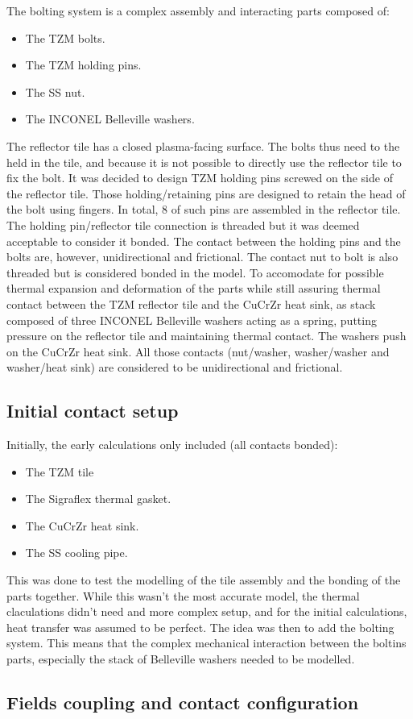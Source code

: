 \normalsize{\indent The bolting system is a complex assembly and interacting parts composed of:
\begin{itemize}
    \item The \acrshort{TZM} bolts.
    \item The \acrshort{TZM} holding pins.
    \item The \acrshort{SS} nut.
    \item The INCONEL Belleville washers.
  \end{itemize}
The reflector tile has a closed plasma-facing surface. The bolts thus need to the held in the tile, and because it is not possible to directly use the reflector tile to fix the bolt. It was decided to design \acrshort{TZM} holding pins screwed on the side of the reflector tile. Those holding/retaining pins are designed to retain the head of the bolt using fingers. In total, 8 of such pins are assembled in the reflector tile. The holding pin/reflector tile connection is threaded but it was deemed acceptable to consider it bonded. The contact between the holding pins and the bolts are, however, unidirectional and frictional. The contact nut to bolt is also threaded but is considered bonded in the model. To accomodate for possible thermal expansion and deformation of the parts while still assuring thermal contact between the \acrshort{TZM} reflector tile and the \acrshort{CuCrZr} heat sink, as stack composed of three INCONEL Belleville washers acting as a spring, putting pressure on the reflector tile and maintaining thermal contact. The washers push on the \acrshort{CuCrZr} heat sink. All those contacts (nut/washer, washer/washer and washer/heat sink) are considered to be unidirectional and frictional.}
\subsection{Initial contact setup}
\normalsize{Initially, the early calculations only included (all contacts bonded):
\begin{itemize}
    \item The \acrshort{TZM} tile
    \item The \acrshort{Sigraflex} thermal gasket.
    \item The \acrshort{CuCrZr} heat sink.
    \item The \acrshort{SS} cooling pipe.
  \end{itemize}
This was done to test the modelling of the tile assembly and the bonding of the parts together. While this wasn't the most accurate model, the thermal claculations didn't need and more complex setup, and for the initial calculations, heat transfer was assumed to be perfect. The idea was then to add the bolting system. This means that the complex mechanical interaction between the boltins parts, especially the stack of Belleville washers needed to be modelled. }
\subsection{Fields coupling and contact configuration}